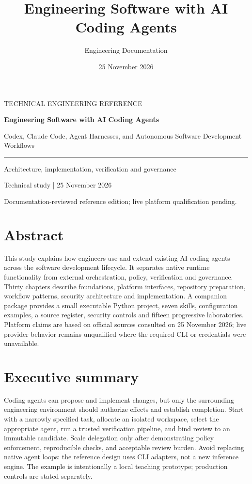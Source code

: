 \documentclass[11pt,oneside,openany]{book}
\title{Engineering Software with AI Coding Agents}
\author{Engineering Documentation}
\date{25 November 2026}
\newif\ifrepohousestyle
\begin{document}
\ifrepohousestyle
\begin{titlepage}
\vspace*{1in}
\makedoctitle
\makedocsummary
\vfill
\end{titlepage}
\else
\begin{titlepage}
\color{navy}
\vspace*{1.1in}
{\large TECHNICAL ENGINEERING REFERENCE\par}
\vspace{.35in}
{\Huge\bfseries Engineering Software with AI Coding Agents\par}
\vspace{.25in}
{\LARGE Codex, Claude Code, Agent Harnesses, and Autonomous Software Development Workflows\par}
\vspace{.45in}
\textcolor{teal}{\rule{\linewidth}{2pt}}\par
{\large Architecture, implementation, verification and governance\par}
\vfill
{\large Technical study | 25 November 2026\par}
{\small Documentation-reviewed reference edition; live platform qualification pending.}
\end{titlepage}
\fi
\frontmatter
\chapter{Abstract}
This study explains how engineers use and extend existing AI coding agents across the software development lifecycle. It separates native runtime functionality from external orchestration, policy, verification and governance. Thirty chapters describe foundations, platform interfaces, repository preparation, workflow patterns, security architecture and implementation. A companion package provides a small executable Python project, seven skills, configuration examples, a source register, security controls and fifteen progressive laboratories. Platform claims are based on official sources consulted on 25 November 2026; live provider behavior remains unqualified where the required CLI or credentials were unavailable.
\chapter{Executive summary}
Coding agents can propose and implement changes, but only the surrounding engineering environment should authorize effects and establish completion. Start with a narrowly specified task, allocate an isolated workspace, select the appropriate agent, run a trusted verification pipeline, and bind review to an immutable candidate. Scale delegation only after demonstrating policy enforcement, reproducible checks, and acceptable review burden. Avoid replacing native agent loops: the reference design uses CLI adapters, not a new inference engine. The example is intentionally a local teaching prototype; production controls are stated separately.
\end{document}

